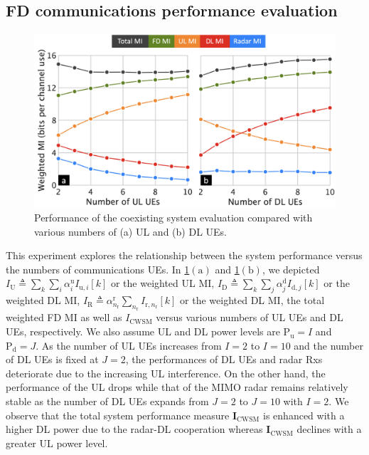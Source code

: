\documentclass[9pt,journal]{IEEEtran}
\newcommand{\paren}[1]{\left({#1}\right)}
\newcommand{\bracket}[1]{{\left [{#1}\right ]}}
\newcommand{\rr}{_\mathrm{r}}
\theoremstyle{definition}
\begin{document}
\subsection{FD communications performance evaluation}
\label{subsec: fd_comm_eva}
\begin{figure}[t]
\vspace{-1em}
\centering
\includegraphics[width=0.9\columnwidth]{fd_UE.png}
\caption{Performance of the coexisting system evaluation compared with various numbers of (a) UL and (b) DL UEs.}
\label{fig:fd_UE}
\vspace{-1em}
\end{figure}
This experiment explores the relationship between the system performance versus the numbers of communications UEs. In \figurename{\;\ref{fig:fd_UE}$\paren{\text{a}}$} and \figurename{\;\ref{fig:fd_UE}$\paren{\text{b}}$}, we depicted $\mathit{I}_{\textrm{U}}\triangleq\sum_{k}\sum_{i}\alpha^\textrm{u}_i\mathit{I}_{\textrm{u},i}\bracket{k}$ or the weighted UL MI, $\mathit{I}_{\textrm{D}}\triangleq\sum_{k}\sum_{j}\alpha^\textrm{d}_j\mathit{I}_{\textrm{d},j}\bracket{k}$ or the weighted DL MI, $\mathit{I}_{\textrm{R}}\triangleq\alpha^\textrm{r}_{n\rr}\sum_{n\rr}\mathit{I}_{\textrm{r},n\rr}\bracket{k}$ or the weighted DL MI, the total weighted FD MI as well as $\mathit{I}_{\textrm{CWSM}}$ versus various numbers of UL UEs and DL UEs, respectively. We also assume UL and DL power levels are  $\mathrm{P}_{\textrm{u}}=I$ and $\mathrm{P}_{\textrm{d}}=J$. As the number of UL UEs 
increases from $\mathit{I}=2$ to $\mathit{I}=10$ and the number of DL UEs is fixed at $\mathit{J}=2$, the performances of DL UEs and radar Rxs deteriorate due to the increasing UL interference. On the other hand, the performance of the UL drops while that of the MIMO radar remains relatively stable as the number of DL UEs expands from $\mathit{J}=2$ to $\mathit{J}=10$ with $\mathit{I}=2$. We observe that the total system performance measure  $\mathbf{I}_{\textrm{CWSM}}$ is enhanced with a higher DL power due to the radar-DL cooperation whereas $\mathbf{I}_{\textrm{CWSM}}$ declines with a greater UL power level. 
\end{document}
